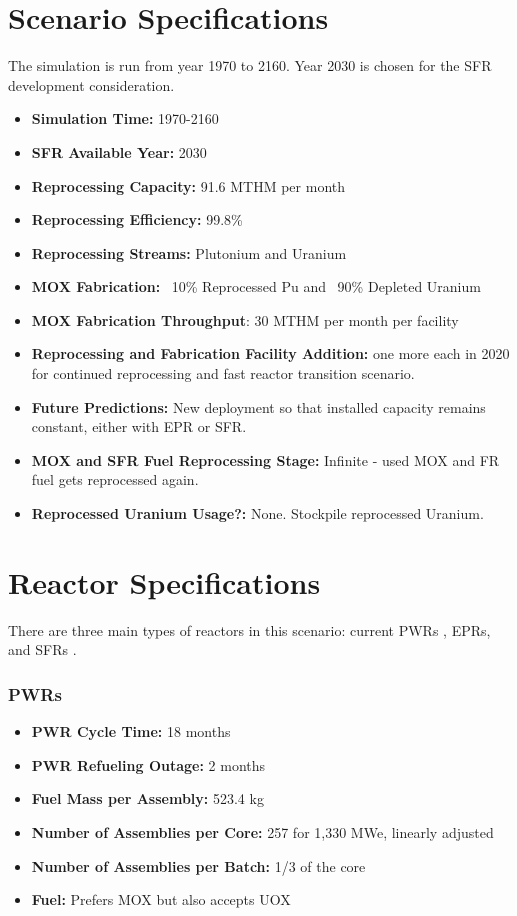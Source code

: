 \section{Scenario Specifications}

The simulation is run from year 1970 to 2160. Year 2030 is chosen for the 
SFR development consideration.

\begin{itemize}
	\item \textbf{Simulation Time:}  1970-2160 
	\item \textbf{\gls{SFR} Available Year:}  2030  
	\item \textbf{Reprocessing Capacity:}  91.6 MTHM per month \cite{schneider_spent_2008}  
	\item \textbf{Reprocessing Efficiency:}  99.8\%  
	\item \textbf{Reprocessing Streams:}  Plutonium and Uranium  
	\item \textbf{\gls{MOX} Fabrication:}  ~10\% Reprocessed Pu and ~90\% Depleted Uranium  
	\item \textbf{\gls{MOX} Fabrication Throughput}: 30 MTHM per month per facility \cite{hugelmann_melox_1999} 
	\item \textbf{Reprocessing and Fabrication Facility Addition:}  one more each in 2020 for continued reprocessing and fast reactor transition scenario. 
	\item \textbf{Future Predictions:} New deployment so that installed capacity remains constant, either with \gls{EPR} or \gls{SFR}.  
	\item \textbf{\gls{MOX} and \gls{SFR} Fuel Reprocessing Stage:}  Infinite - used \gls{MOX} and \gls{FR} fuel gets reprocessed again.  
	\item\textbf{Reprocessed Uranium Usage?:}  None. Stockpile reprocessed Uranium. \\
\end{itemize}

\section{Reactor Specifications}
There are three main types of reactors in this scenario: current \gls{PWR}s \cite{larmarsh_introduction_1983},
\gls{EPR}s, and \gls{SFR}s  \cite{martin_symbiotic_2017}. 

\subsubsection{\gls{PWR}s}
\begin{itemize}
	\item \textbf{PWR Cycle Time:} 18 months  
	\item \textbf{PWR Refueling Outage:} 2 months  
	\item \textbf{Fuel Mass per Assembly:} 523.4 kg  
	\item \textbf{Number of Assemblies per Core:} 257 for 1,330 MWe, linearly adjusted  
	\item \textbf{Number of Assemblies per Batch:} 1/3 of the core  
	\item \textbf{Fuel:} Prefers \gls{MOX} but also accepts \gls{UOX}
\end{itemize}

